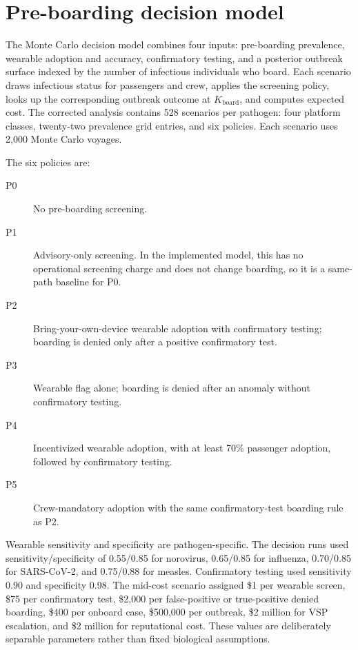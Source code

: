 \section{Pre-boarding decision model}
The Monte Carlo decision model combines four inputs: pre-boarding prevalence, wearable adoption and
accuracy, confirmatory testing, and a posterior outbreak surface indexed by the number of infectious
individuals who board.
Each scenario draws infectious status for passengers and crew, applies the screening policy, looks
up the corresponding outbreak outcome at $K_{\mathrm{board}}$, and computes expected cost.
The corrected analysis contains 528 scenarios per pathogen: four platform classes, twenty-two
prevalence grid entries, and six policies.
Each scenario uses 2,000 Monte Carlo voyages.

The six policies are:
\begin{description}
\item[P0] No pre-boarding screening.
\item[P1] Advisory-only screening. In the implemented model, this has no operational screening
charge and does not change boarding, so it is a same-path baseline for P0.
\item[P2] Bring-your-own-device wearable adoption with confirmatory testing; boarding is denied only
after a positive confirmatory test.
\item[P3] Wearable flag alone; boarding is denied after an anomaly without confirmatory testing.
\item[P4] Incentivized wearable adoption, with at least 70\% passenger adoption, followed by
confirmatory testing.
\item[P5] Crew-mandatory adoption with the same confirmatory-test boarding rule as P2.
\end{description}

Wearable sensitivity and specificity are pathogen-specific.
The decision runs used sensitivity/specificity of 0.55/0.85 for norovirus, 0.65/0.85 for influenza,
0.70/0.85 for SARS-CoV-2, and 0.75/0.88 for measles.
Confirmatory testing used sensitivity 0.90 and specificity 0.98.
The mid-cost scenario assigned \$1 per wearable screen, \$75 per confirmatory test, \$2,000 per
false-positive or true-positive denied boarding, \$400 per onboard case, \$500,000 per outbreak,
\$2 million for VSP escalation, and \$2 million for reputational cost.
These values are deliberately separable parameters rather than fixed biological assumptions.

